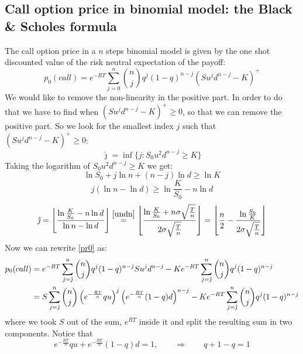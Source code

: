 \subsection[The Black \& Scholes formula]{Call option price in binomial model: the Black \& Scholes formula}
The call option price in a $n$ steps binomial model is given by the one shot discounted value of the risk neutral expectation of the payoff:
\begin{equation}\label{pr0}
    p_0(call)=e^{-RT}\sum^{n}_{j=0}\binom{n}{j}q^j(1-q)^{n-j}(Su^j d^{n-j}-K)^+
\end{equation}
We would like to remove the non-linearity in the positive part. In order to do that we have to find when $(Su^j d^{n-j}-K)^+\ge0$, so that we can remove the positive part. So we look for the smallest index $j$ such that $(Su^j d^{n-j}-K)^+\ge0$:
\begin{equation}
    \hat{\jmath} = \inf\{j:S_0u^2d^{n-j}\ge K\}
\end{equation}
Taking the logarithm of $S_0u^2d^{n-j}\ge K$ we get:
\begin{equation}
    \ln S_0 + j\ln n + (n-j)\ln d \ge \ln K
\end{equation}
\begin{equation}
    j(\ln n - \ln d) \ge \ln\dfrac{K}{S_0}-n\ln d
\end{equation}
\begin{equation}\label{jhat}
    \hat{\jmath} = \floor*{\dfrac{\ln\frac{K}{S_0}-n\ln d}{\ln n - \ln d}} \overset{\eqref{undn}}{=} \floor*{\dfrac{\ln\frac{K}{S_0}+n\sigma\sqrt{\frac{T}{n}}}{2\sigma\sqrt{\frac{T}{n}}}}=
    \floor*{\dfrac{n}{2}-\dfrac{\ln\frac{S_0}{K}}{2\sigma\sqrt{\frac{T}{n}}}}
\end{equation}
Now we can rewrite \eqref{pr0} as:
\begin{align}\label{pr01}
    \notag p_0(call)
    &=
    e^{-RT}\sum^{n}_{j=\hat{\jmath}}\binom{n}{j}q^j(1-q)^{n-j}Su^j d^{n-j}- Ke^{-RT}\sum^{n}_{j=\hat{\jmath}}\binom{n}{j}q^j(1-q)^{n-j}\\
    &=
    S\sum^{n}_{j=\hat{\jmath}}\binom{n}{j}\left(e^{-\frac{RT}{n}}qu\right)^j\left(e^{-\frac{RT}{n}}(1-q)d\right)^{n-j} - Ke^{-RT}\sum^{n}_{j=\hat{\jmath}}\binom{n}{j}q^j(1-q)^{n-j}
\end{align}
where we took $S$ out of the sum, $e^{RT}$ inside it and split the resulting sum in two components. Notice that 
\begin{equation*}
    e^{-\frac{RT}{n}}qu + e^{-\frac{RT}{n}}(1-q)d=1, \qquad\Rightarrow\qquad q + 1-q = 1
\end{equation*}
